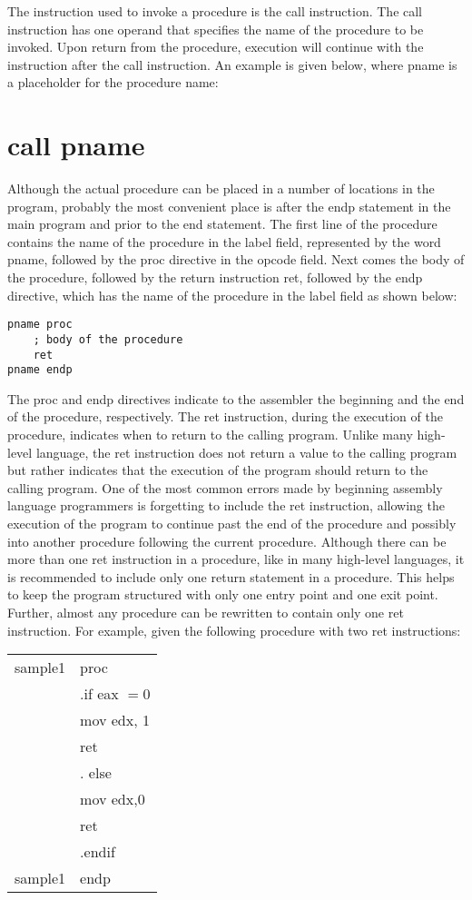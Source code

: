 \documentclass[10pt]{article}
\begin{document}
The instruction used to invoke a procedure is the call instruction. The call instruction has one operand that specifies the name of the procedure to be invoked. Upon return from the procedure, execution will continue with the instruction after the call instruction. An example is given below, where pname is a placeholder for the procedure name:

\section*{call pname}
Although the actual procedure can be placed in a number of locations in the program, probably the most convenient place is after the endp statement in the main program and prior to the end statement. The first line of the procedure contains the name of the procedure in the label field, represented by the word pname, followed by the proc directive in the opcode field. Next comes the body of the procedure, followed by the return instruction ret, followed by the endp directive, which has the name of the procedure in the label field as shown below:

\begin{verbatim}
pname proc
    ; body of the procedure
    ret
pname endp
\end{verbatim}

The proc and endp directives indicate to the assembler the beginning and the end of the procedure, respectively. The ret instruction, during the execution of the procedure, indicates when to return to the calling program. Unlike many high-level language, the ret instruction does not return a value to the calling program but rather indicates that the execution of the program should return to the calling program. One of the most common errors made by beginning assembly language programmers is forgetting to include the ret instruction, allowing the execution of the program to continue past the end of the procedure and possibly into another procedure following the current procedure. Although there can be more than one ret instruction in a procedure, like in many high-level languages, it is recommended to include only one return statement in a procedure. This helps to keep the program structured with only one entry point and one exit point. Further, almost any procedure can be rewritten to contain only one ret instruction. For example, given the following procedure with two ret instructions:

\begin{center}
\begin{tabular}{ll}
sample1 & proc \\
 & .if eax $=0$ \\
 & mov edx, 1 \\
 & ret \\
 & . else \\
 & mov edx,0 \\
 & ret \\
 & .endif \\
sample1 & endp \\
\end{tabular}
\end{center}
\end{document}
